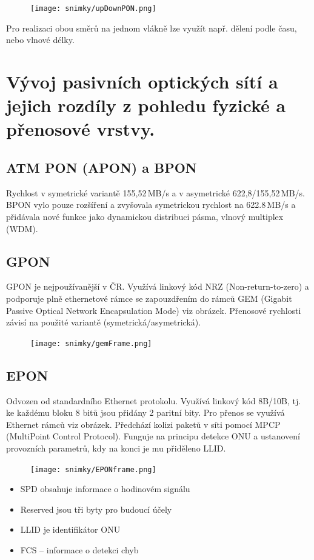 \begin{figure} [h]
    \centering
    \texttt{[image: snimky/upDownPON.png]}
\end{figure}

Pro realizaci obou směrů na jednom vlákně lze využít např. dělení podle času, nebo vlnové délky.
\clearpage
\section{Vývoj pasivních optických sítí a jejich rozdíly z pohledu fyzické a přenosové vrstvy.}

\subsection{ATM PON (APON) a BPON}
Rychlost v symetrické variantě 155,52\,MB/s a v asymetrické 622,8/155,52\,MB/s. BPON vylo pouze rozšíření a zvyšovala symetrickou rychlost na 622.8\,MB/s a přidávala nové funkce jako dynamickou distribuci pásma, vlnový multiplex (WDM).

\subsection{GPON}
GPON je nejpoužívanější v ČR. Využívá linkový kód NRZ (Non-return-to-zero) a podporuje plně ethernetové rámce se zapouzdřením do rámců GEM (Gigabit Passive Optical Network Encapsulation Mode) viz obrázek. Přenosové rychlosti závisí na použité variantě (symetrická/asymetrická).

\begin{figure} [h]
    \centering
    \texttt{[image: snimky/gemFrame.png]}
\end{figure}

\subsection{EPON}
Odvozen od standardního Ethernet protokolu. Využívá linkový kód 8B/10B, tj. ke každému bloku 8 bitů jsou přidány 2 paritní bity. Pro přenos se využívá Ethernet rámců viz obrázek. Předchází kolizi paketů v síti pomocí MPCP (MultiPoint Control Protocol). Funguje na principu detekce ONU a ustanovení provozních parametrů, kdy na konci je mu přiděleno LLID.

\begin{figure} [h]
    \centering
    \texttt{[image: snimky/EPONframe.png]}
\end{figure}

\begin{itemize}
    \item SPD obsahuje informace o hodinovém signálu
    \item Reserved jsou tři byty pro budoucí účely
    \item LLID je identifikátor ONU
    \item FCS -- informace o detekci chyb
\end{itemize}

